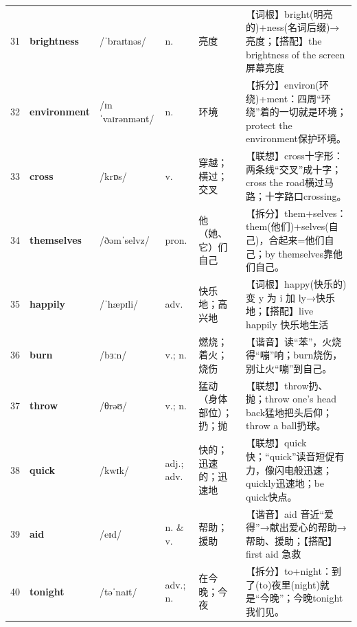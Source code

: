 \documentclass[UTF8,a4paper,11pt,oneside]{ctexbook}
\newcommand{\cellword}[1]{{\bfseries\textcolor{wordcol}{#1}}}
\newcommand{\cellipa}[1]{{\footnotesize\textcolor{ipacol}{#1}}}
\newcommand{\cellpos}[1]{\textcolor{poscol}{#1}}
\newcommand{\cellno}[1]{\textcolor{volcolor!75!black}{#1}}
\begin{document}
{\begin{longtable}{@{}C{0.045\textwidth}L{0.155\textwidth}L{0.175\textwidth}C{0.070\textwidth}L{0.180\textwidth}L{0.282\textwidth}@{}}
 \cellno{31} & \cellword{brightness} & \cellipa{/ˈbraɪtnəs/} & \cellpos{n.} & 亮度 & \textcolor{tagRoot}{【词根】}bright(明亮的)+ness(名词后缀)→\allowbreak{}亮度；\textcolor{tagColloc}{【搭配】}the brightness of the screen 屏幕亮度 \\
\cellno{32} & \cellword{environment} & \cellipa{/ɪnˈvaɪrənmənt/} & \cellpos{n.} & 环境 & \textcolor{tagSplit}{【拆分】}environ(环绕)+ment：四周“环绕”着的一切就是环境；protect the environment保护环境。 \\
 \cellno{33} & \cellword{cross} & \cellipa{/krɒs/} & \cellpos{v.} & 穿越；横过；交叉 & \textcolor{tagAssoc}{【联想】}cross十字形：两条线“交叉”成十字；cross the road横过马路；十字路口crossing。 \\
\cellno{34} & \cellword{themselves} & \cellipa{/ðəmˈselvz/} & \cellpos{pron.} & 他（她、它）们自己 & \textcolor{tagSplit}{【拆分】}them+selves：them(他们)+selves(自己)，合起来=他们自己；by themselves靠他们自己。 \\
 \cellno{35} & \cellword{happily} & \cellipa{/ˈhæpɪli/} & \cellpos{adv.} & 快乐地；高兴地 & \textcolor{tagRoot}{【词根】}happy(快乐的)变 y 为 i 加 ly→\allowbreak{}快乐地；\textcolor{tagColloc}{【搭配】}live happily 快乐地生活 \\
\cellno{36} & \cellword{burn} & \cellipa{/bɜːn/} & \cellpos{v.;\allowbreak{} n.} & 燃烧；着火；烧伤 & \textcolor{tagSound}{【谐音】}读“苯”，火烧得“嘣”响；burn烧伤，别让火“嘣”到自己。 \\
 \cellno{37} & \cellword{throw} & \cellipa{/θrəʊ/} & \cellpos{v.;\allowbreak{} n.} & 猛动（身体部位）；扔；抛 & \textcolor{tagAssoc}{【联想】}throw扔、抛；throw one's head back猛地把头后仰；throw a ball扔球。 \\
\cellno{38} & \cellword{quick} & \cellipa{/kwɪk/} & \cellpos{adj.;\allowbreak{} adv.} & 快的；迅速的；迅速地 & \textcolor{tagAssoc}{【联想】}quick快；“quick”读音短促有力，像闪电般迅速；quickly迅速地；be quick快点。 \\
 \cellno{39} & \cellword{aid} & \cellipa{/eɪd/} & \cellpos{n.  \& v.} & 帮助；援助 & \textcolor{tagSound}{【谐音】}aid 音近“爱得”→\allowbreak{}献出爱心的帮助→\allowbreak{}帮助、援助；\textcolor{tagColloc}{【搭配】}first aid 急救 \\
\cellno{40} & \cellword{tonight} & \cellipa{/təˈnaɪt/} & \cellpos{adv.;\allowbreak{} n.} & 在今晚；今夜 & \textcolor{tagSplit}{【拆分】}to+night：到了(to)夜里(night)就是“今晚”；今晚tonight我们见。 \\

\end{longtable}}
\end{document}
